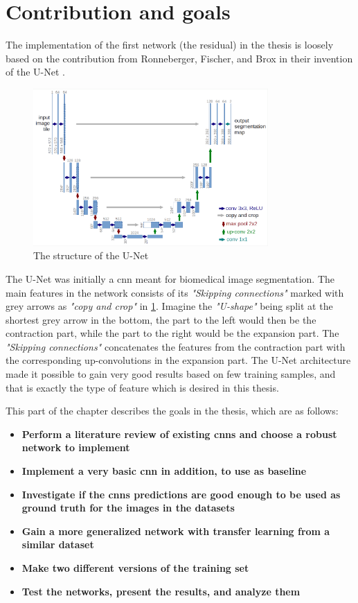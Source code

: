 \documentclass[USenglish]{ifimaster}  %
\begin{document}
\section{Contribution and goals}
The implementation of the first network (the residual) in the thesis is loosely based on the contribution from Ronneberger, Fischer, and Brox in their invention of the U-Net \cite{website:u_net_article}. 
\begin{figure}[ht]
    \centering
    \includegraphics[width=0.8\textwidth]{bilder/u_net.png}
    \caption{The structure of the U-Net \cite{website:u_net}}
    \label{fig:u_net}
\end{figure}
The U-Net was initially a \ac{cnn} meant for biomedical image segmentation. The main features in the network consists of its \textit{"Skipping connections"} marked with grey arrows as \textit{"copy and crop"} in \cref{fig:u_net}. Imagine the \textit{"U-shape"} being split at the shortest grey arrow in the bottom, the part to the left would then be the contraction part, while the part to the right would be the expansion part. The \textit{"Skipping connections"} concatenates the features from the contraction part with the corresponding up-convolutions in the expansion part. The U-Net architecture made it possible to gain very good results based on few training samples, and that is exactly the type of feature which is desired in this thesis.

This part of the chapter describes the goals in the thesis, which are as follows:
\begin{itemize}
    \item \textbf{Perform a literature review of existing \acp{cnn} and choose a robust network to implement}
    \item \textbf{Implement a very basic \ac{cnn} in addition, to use as baseline}
    \item \textbf{Investigate if the \acp{cnn} predictions are good enough to be used as ground truth for the images in the datasets}
    \item \textbf{Gain a more generalized network with transfer learning from a similar dataset}
    \item \textbf{Make two different versions of the training set}
    \item \textbf{Test the networks, present the results, and analyze them}
\end{itemize}
\end{document}
